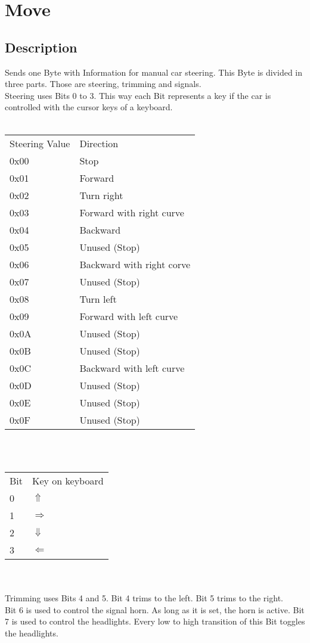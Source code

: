 \section{Move}

\subsection{Description}
Sends one Byte with Information for manual car steering. 
This Byte is divided in three parts. Those are steering, trimming and 
signals. \\
Steering uses Bits 0 to 3. This way each Bit represents a key if the car is 
controlled with the cursor keys of a keyboard. \\\\
\begin{tabular}{ll}
Steering Value  & Direction \\
0x00    & Stop \\
0x01    & Forward \\
0x02    & Turn right \\
0x03    & Forward with right curve \\
0x04    & Backward \\
0x05    & Unused (Stop) \\
0x06    & Backward with right corve \\
0x07    & Unused (Stop) \\
0x08    & Turn left \\
0x09    & Forward with left curve \\
0x0A    & Unused (Stop) \\
0x0B    & Unused (Stop) \\
0x0C    & Backward with left curve \\
0x0D    & Unused (Stop) \\
0x0E    & Unused (Stop) \\
0x0F    & Unused (Stop) \\
\end{tabular}\\\\
\begin{tabular}{ll}
Bit & Key on keyboard \\
0   & $\Uparrow$ \\
1   & $\Rightarrow$ \\
2   & $\Downarrow$ \\
3   & $\Leftarrow$ \\
\end{tabular}\\\\
Trimming uses Bits 4 and 5. Bit 4 trims to the left. Bit 5 trims to the 
right. \\
Bit 6 is used to control the signal horn. As long as it is set, the horn is 
active. 
Bit 7 is used to control the headlights. Every low to high transition of this 
Bit toggles the headlights. 
